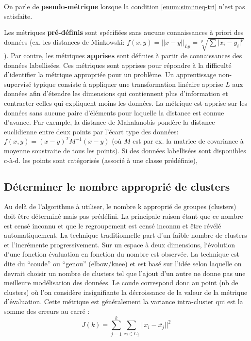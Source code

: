 On parle de \textbf{pseudo-métrique} lorsque la condition \ref{enum:sim:ineq-tri} n'est pas satisfaite.

Les métriques \textbf{pré-définis} sont spécifiées sans aucune connaissances à priori des données (ex. les distances de Minkowski: $f(x,y) = \vert\vert x - y \vert\vert_{Lp} = \sqrt[p]{\sum \vert x_i - y_i \vert ^p}$). Par contre, les métriques \textbf{apprises} sont définies à partir de connaissances des données labellisées. Ces métriques sont apprises pour répondre à la difficulté d'identifier la métrique appropriée pour un problème. Un apprentissage non-supervisé typique consiste à appliquer une transformation linéaire apprise $L$ aux données afin d'étendre les dimensions qui contiennent plus d'information et contracter celles qui expliquent moins les données. La métrique est apprise sur les données sans aucune paire d'éléments pour laquelle la distance est connue d'avance. Par exemple, la distance de Mahalanobis pondère la distance euclidienne entre deux points par l'écart type des données: $f(x,y) = (x-y)^T M^{-1}(x-y)$ (où $M$ est par ex. la matrice de covariance à moyenne soustraite de tous les points). Si des données labellisées sont disponibles c-à-d. les points sont catégorisés (associé à une classe prédéfinie), 


\subsection{Déterminer le nombre approprié de clusters}
    Au delà de l’algorithme à utiliser, le nombre k approprié de groupes (clusters) doit être déterminé mais pas prédéfini. La principale raison étant que ce nombre est censé inconnu et que le regroupement est censé inconnu et être révélé automatiquement.
La technique traditionnelle part d’un faible nombre de clusters et l’incrémente progressivement. Sur un espace à deux dimensions,  l‘évolution d’une fonction évaluation en fonction du nombre est observée.  La technique est dite du “coude” ou “genou” (elbow/knee) et est basé sur l’idée selon laquelle on devrait choisir un nombre de clusters tel que l’ajout d’un autre ne donne pas une meilleure modélisation des données. Le coude correspond donc au point (nb de clusters) où l’on considère insignifiante la décroissance de la valeur de la métrique d’évaluation. Cette métrique est généralement la variance intra-cluster qui est la somme des erreurs au carré  :
\[J(k) = \sum\limits_{j=1}^k\sum\limits_{x_i \in C_j}\vert\vert x_i-\overline{x_j}\vert\vert^2\]

